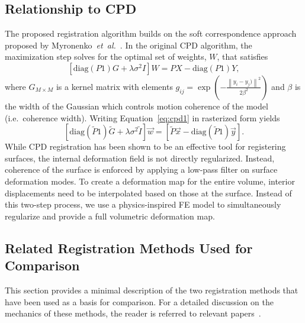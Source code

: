 \documentclass[journal]{IEEEtran}
\newcommand{\diag}{\mathrm{diag}}
\begin{document}
\subsection{Relationship to CPD}
The proposed registration algorithm builds on the soft correspondence approach proposed by Myronenko~\textit{et~al.}~\cite{Myronenko10a}. In the original CPD algorithm, the maximization step solves for the optimal set of weights, $W$, that satisfies
\begin{equation} \label{eq:cpd1}
\left[\diag(P1)G + \lambda\sigma^2I\right]W = PX - \diag\left(P1\right)Y,
\end{equation}
where $G_{M \times M}$ is a kernel matrix with elements $g_{ij}=\exp{\left(-\frac{\left\|y_i- y_j)\right\|^2}{2\beta^2}\right)}$ and $\beta$ is the width of the Gaussian which controls motion coherence of the model (i.e.~coherence width). Writing Equation~\eqref{eq:cpd1} in rasterized form yields
\begin{equation} \label{eq:cpd2}
\left[\diag(\tilde{P}1)\tilde{G} + \lambda\sigma^2\tilde{I}\right]\vec{w} = [\tilde{P}\vec{x} - \diag\left(\tilde{P}1\right)\vec{y}].
\end{equation}
While CPD registration has been shown to be an effective tool for registering surfaces, the internal deformation field is not directly regularized. Instead, coherence of the surface is enforced by applying a low-pass filter on surface deformation modes.  To create a deformation map for the entire volume, interior displacements need to be interpolated based on those at the surface.  Instead of this two-step process, we use a physics-inspired FE model to simultaneously regularize and provide a full volumetric deformation map.
\subsection{Related Registration Methods Used for Comparison}
This section provides a minimal description of the two registration methods that have been used as a basis for comparison. For a detailed discussion on the mechanics of these methods, the reader is referred to relevant papers~\cite{Chui03a,Ferrant01a}.
\end{document}
